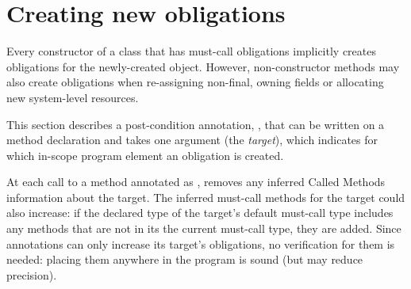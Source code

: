 \section{Creating new obligations}
\label{sec:reset-must-call}

Every constructor of a class that has must-call obligations
implicitly creates obligations for the newly-created object.
However, non-constructor methods may also create obligations
when re-assigning non-final, owning fields or allocating
new system-level resources.

This section describes a post-condition annotation,
\ResetMustCall, that can be written on a method
declaration and takes one argument (the \emph{target}), which
indicates for which in-scope program element an obligation is created.

At each call to a method annotated as \ResetMustCall, \Tool removes any
inferred Called Methods information about the target.
The inferred must-call methods for the target could also increase:
if the declared type of the target's default must-call type includes any
methods that are not in its the current must-call type, they are added.
Since \ResetMustCall annotations can only increase its target's obligations,
no verification for them is needed: placing them anywhere in the program is sound
(but may reduce precision).

